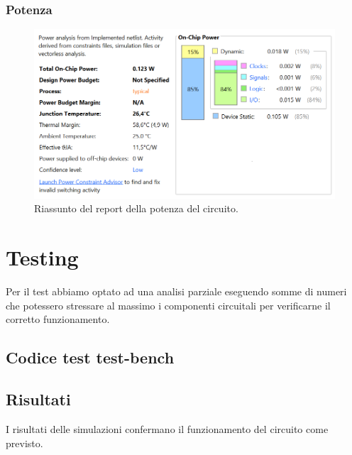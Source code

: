 \documentclass[12pt]{article}
\begin{document}
            \subsubsection{Potenza}
                \begin{figure}[ht]
                    \centering
                    \includegraphics[scale=0.8]{Power.png}
                    \caption{Riassunto del report della potenza del circuito.}
                \end{figure}

\section{Testing}
    Per il test abbiamo optato ad una analisi parziale eseguendo somme di numeri che potessero stressare al massimo i componenti circuitali per verificarne il corretto funzionamento.
    \newpage

    \subsection{Codice test test-bench}
        

    \subsection{Risultati}
        I risultati delle simulazioni confermano il funzionamento del circuito come previsto.
\end{document}
